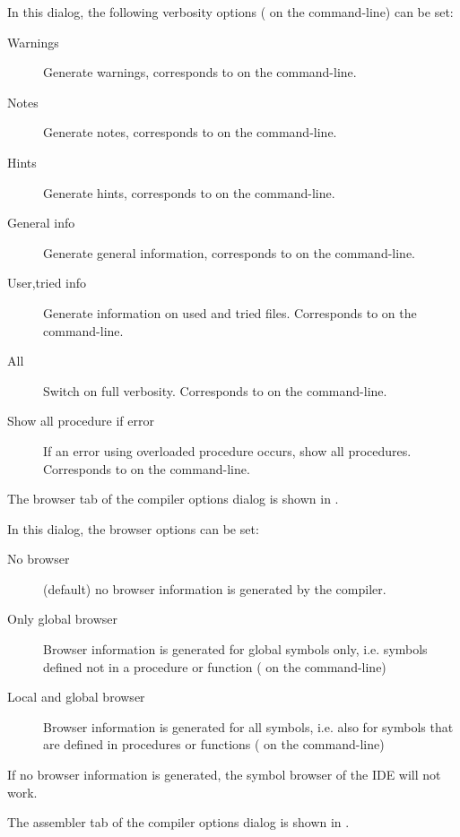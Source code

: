 
In this dialog, the following verbosity options ( on the
command-line) can be set:
\begin{description}
\item[Warnings] Generate warnings, corresponds to  on the
command-line.
\item[Notes] Generate notes, corresponds to  on the
command-line.
\item[Hints] Generate hints, corresponds to  on the
command-line.
\item[General info] Generate general information, corresponds to  on the
command-line.
\item[User,tried info] Generate information on used and tried files. Corresponds to  on the
command-line.
\item[All] Switch on full verbosity. Corresponds to  on the
command-line.
\item[Show all procedure if error] If an error using overloaded procedure
occurs, show all procedures. Corresponds to  on the
command-line.
\end{description}
The browser tab of the compiler options dialog is shown in
.


In this dialog, the browser options can be set:
\begin{description}
\item[No browser] (default) no browser information is generated by the
compiler.
\item[Only global browser] Browser information is generated for global
symbols only, i.e. symbols defined not in a procedure or function ( on the command-line)
\item[Local and global browser]  Browser information is generated for all 
symbols, i.e. also for symbols that are defined in procedures or functions 
 ( on the command-line)
\end{description}
\begin{remark}
If no browser information is generated, the symbol browser of the IDE will
not work.
\end{remark}
The assembler tab of the compiler options dialog is shown in
.


